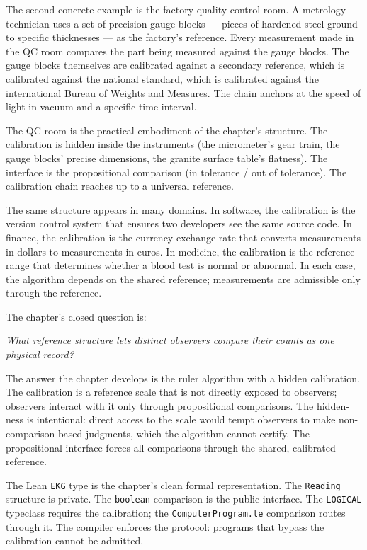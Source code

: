 \begin{chapteressay}
The second concrete example is the factory quality-control room. A
metrology technician uses a set of precision gauge blocks --- pieces of
hardened steel ground to specific thicknesses --- as the factory's
reference. Every measurement made in the QC room compares the part
being measured against the gauge blocks. The gauge blocks themselves
are calibrated against a secondary reference, which is calibrated
against the national standard, which is calibrated against the
international Bureau of Weights and Measures. The chain anchors at
the speed of light in vacuum and a specific time interval.

The QC room is the practical embodiment of the chapter's structure.
The calibration is hidden inside the instruments (the micrometer's
gear train, the gauge blocks' precise dimensions, the granite
surface table's flatness). The interface is the propositional
comparison (in tolerance / out of tolerance). The calibration chain
reaches up to a universal reference.

The same structure appears in many domains. In software, the
calibration is the version control system that ensures two
developers see the same source code. In finance, the calibration is
the currency exchange rate that converts measurements in dollars to
measurements in euros. In medicine, the calibration is the reference
range that determines whether a blood test is normal or abnormal.
In each case, the algorithm depends on the shared reference;
measurements are admissible only through the reference.

The chapter's closed question is:

\begin{center}
\emph{What reference structure lets distinct observers compare their
counts as one physical record?}
\end{center}

The answer the chapter develops is the ruler algorithm with a
hidden calibration. The calibration is a reference scale that is
not directly exposed to observers; observers interact with it only
through propositional comparisons. The hidden-ness is intentional:
direct access to the scale would tempt observers to make non-
comparison-based judgments, which the algorithm cannot certify.
The propositional interface forces all comparisons through the
shared, calibrated reference.

The Lean \texttt{EKG} type is the chapter's clean formal
representation. The \texttt{Reading} structure is private. The
\texttt{boolean} comparison is the public interface. The
\texttt{LOGICAL} typeclass requires the calibration; the
\texttt{ComputerProgram.le} comparison routes through it. The
compiler enforces the protocol: programs that bypass the
calibration cannot be admitted.


\end{chapteressay}
